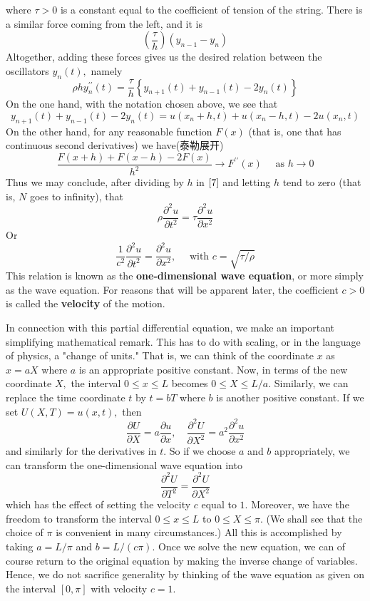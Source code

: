 \documentclass[12pt]{book}
\theoremstyle{definition}\newtheorem{dfn}{Définition}[chapter]
\theoremstyle{plain}\newtheorem{thm}{Théorème}[chapter]
\theoremstyle{plain}\newtheorem{prp}{Proposition}[chapter]
\theoremstyle{plain}\newtheorem{lem}{\bf Lemme}[chapter]
\theoremstyle{plain}\newtheorem{axm}{\bf Axiome}[chapter]
\theoremstyle{plain}\newtheorem{lmm}{\bf Lemme}[chapter]
\theoremstyle{plain}\newtheorem{exm}{\bf Example}[chapter]
\theoremstyle{plain}\newtheorem{cor}{\bf Corollaire}[chapter]
\theoremstyle{remark}\newtheorem{rem}{Remarque}[chapter]
\begin{document}
where $\tau>0$ is a constant equal to the coefficient of tension of the string. There is a similar force coming from the left, and it is
$$
\left(\frac{\tau}{h}\right)\left(y_{n-1}-y_{n}\right)
$$
Altogether, adding these forces gives us the desired relation between the oscillators $y_{n}(t),$ namely
\begin{equation}
\rho h y_{n}^{\prime \prime}(t)=\frac{\tau}{h}\left\{y_{n+1}(t)+y_{n-1}(t)-2 y_{n}(t)\right\}\label{7}
\end{equation}
On the one hand, with the notation chosen above, we see that
$$
y_{n+1}(t)+y_{n-1}(t)-2 y_{n}(t)=u\left(x_{n}+h, t\right)+u\left(x_{n}-h, t\right)-2 u\left(x_{n}, t\right)
$$
On the other hand, for any reasonable function $F(x)$ (that is, one that has continuous second derivatives) we have(泰勒展开)
$$
\frac{F(x+h)+F(x-h)-2 F(x)}{h^{2}} \rightarrow F^{\prime \prime}(x) \quad \text { as } h \rightarrow 0
$$
Thus we may conclude, after dividing by $h$ in $\ref{7}$ and letting $h$ tend to zero (that is, $N$ goes to infinity), that
$$
\rho \frac{\partial^{2} u}{\partial t^{2}}=\tau \frac{\partial^{2} u}{\partial x^{2}}
$$
Or
$$
\frac{1}{c^{2}} \frac{\partial^{2} u}{\partial t^{2}}=\frac{\partial^{2} u}{\partial x^{2}}, \quad \text { with } c=\sqrt{\tau / \rho}
$$
This relation is known as the {\bf one-dimensional wave equation}, or more simply as the wave equation. For reasons that will be apparent later, the coefficient $c>0$ is called the {\bf velocity} of the motion.

In connection with this partial differential equation, we make an important simplifying mathematical remark. This has to do with scaling, or in the language of physics, a "change of units." That is, we can think of the coordinate $x$ as $x=a X$ where $a$ is an appropriate positive constant. Now, in terms of the new coordinate $X,$ the interval $0 \leq x \leq L$ becomes $0 \leq X \leq L / a .$ Similarly, we can replace the time coordinate $t$ by $t=b T$ where $b$ is another positive constant. If we set $U(X, T)=u(x, t),$ then
$$
\frac{\partial U}{\partial X}=a \frac{\partial u}{\partial x}, \quad \frac{\partial^{2} U}{\partial X^{2}}=a^{2} \frac{\partial^{2} u}{\partial x^{2}}
$$
and similarly for the derivatives in $t .$ So if we choose $a$ and $b$ appropriately, we can transform the one-dimensional wave equation into
$$
\frac{\partial^{2} U}{\partial T^{2}}=\frac{\partial^{2} U}{\partial X^{2}}
$$
which has the effect of setting the velocity $c$ equal to $1 .$ Moreover, we have the freedom to transform the interval $0 \leq x \leq L$ to $0 \leq X \leq \pi .$ (We shall see that the choice of $\pi$ is convenient in many circumstances.) All this is accomplished by taking $a=L / \pi$ and $b=L /(c \pi) .$ Once we solve the new equation, we can of course return to the original equation by making the inverse change of variables. Hence, we do not sacrifice generality by thinking of the wave equation as given on the interval $[0, \pi]$ with velocity $c=1.$
\end{document}
